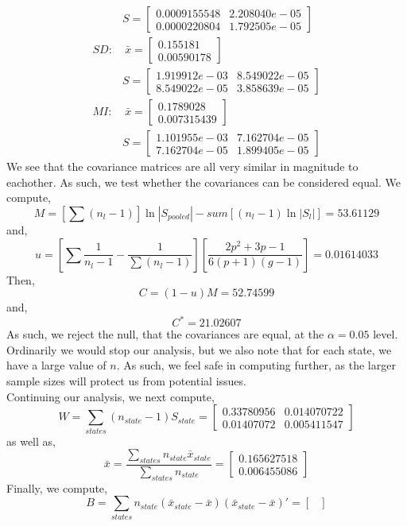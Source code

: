 \documentclass[letterpaper,10pt]{article}
\begin{document}
\begin{enumerate}
\begin{align*}
& S = \begin{bmatrix}
0.0009155548 & 2.208040e-05\\
0.0000220804 & 1.792505e-05
\end{bmatrix}\\
SD: &\  \bar{x}=\begin{bmatrix}
0.155181 \\ 0.00590178
\end{bmatrix}\\
& S = \begin{bmatrix}
1.919912e-03 & 8.549022e-05\\
8.549022e-05 & 3.858639e-05
\end{bmatrix}\\
MI: &\  \bar{x}=\begin{bmatrix}
0.1789028 \\ 0.007315439
\end{bmatrix}\\
& S = \begin{bmatrix}
1.101955e-03 & 7.162704e-05\\
7.162704e-05 & 1.899405e-05
\end{bmatrix}
\end{align*}
We see that the covariance matrices are all very similar in magnitude to eachother. As such, we test whether the covariances can be considered equal. We compute,
\[M = \left[\sum (n_l-1)\right]\ln|S_{pooled}|-sum[(n_l-1)\ln|S_l|]=53.61129\]
and,
\[u=\left[\sum\frac{1}{n_l-1}-\frac{1}{\sum(n_l-1)}\right]\left[\frac{2p^2+3p-1}{6(p+1)(g-1)}\right]=0.01614033\]
Then,
\[C=(1-u)M=52.74599\]
and,
\[C^*=21.02607\]
As such, we reject the null, that the covariances are equal, at the $\alpha=0.05$ level. Ordinarily we would stop our analysis, but we also note that for each state, we have a large value of $n$. As such, we feel safe in computing further, as the larger sample sizes will protect us from potential issues.\\
Continuing our analysis, we next compute,
\[W=\sum_{states} (n_{state}-1)S_{state}=\begin{bmatrix}
0.33780956 & 0.014070722\\
0.01407072 & 0.005411547
\end{bmatrix} \]
as well as,
\[\bar{x}=\frac{\sum_{states}n_{state}\bar{x}_{state}}{\sum_{states}n_{state}}=\begin{bmatrix}
0.165627518\\0.006455086
\end{bmatrix}\]
Finally, we compute,
\[B=\sum_{states}n_{state}(\bar{x}_{state}-\bar{x})(\bar{x}_{state}-\bar{x})'=\begin{bmatrix}

\end{bmatrix}\]
\end{enumerate}
\end{document}
